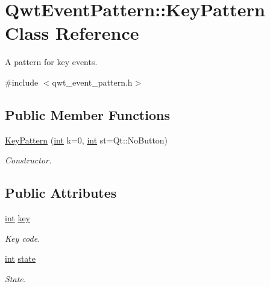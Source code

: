 \hypertarget{class_qwt_event_pattern_1_1_key_pattern}{\section{Qwt\-Event\-Pattern\-:\-:Key\-Pattern Class Reference}
\label{class_qwt_event_pattern_1_1_key_pattern}
}


A pattern for key events.  




{\ttfamily \#include $<$qwt\-\_\-event\-\_\-pattern.\-h$>$}

\subsection*{Public Member Functions}
\begin{DoxyCompactItemize}
\item 
\hyperlink{class_qwt_event_pattern_1_1_key_pattern_a05617562752d1873c0f1be748772b44c}{Key\-Pattern} (\hyperlink{ioapi_8h_a787fa3cf048117ba7123753c1e74fcd6}{int} k=0, \hyperlink{ioapi_8h_a787fa3cf048117ba7123753c1e74fcd6}{int} st=Qt\-::\-No\-Button)
\begin{DoxyCompactList}\small\item\em Constructor. \end{DoxyCompactList}\end{DoxyCompactItemize}
\subsection*{Public Attributes}
\begin{DoxyCompactItemize}
\item 
\hyperlink{ioapi_8h_a787fa3cf048117ba7123753c1e74fcd6}{int} \hyperlink{class_qwt_event_pattern_1_1_key_pattern_af13072b058c3abbb591450b82f049dd6}{key}
\begin{DoxyCompactList}\small\item\em Key code. \end{DoxyCompactList}\item 
\hyperlink{ioapi_8h_a787fa3cf048117ba7123753c1e74fcd6}{int} \hyperlink{class_qwt_event_pattern_1_1_key_pattern_a44033aa9ff7c151fc6e7968f08734926}{state}
\begin{DoxyCompactList}\small\item\em State. \end{DoxyCompactList}\end{DoxyCompactItemize}


